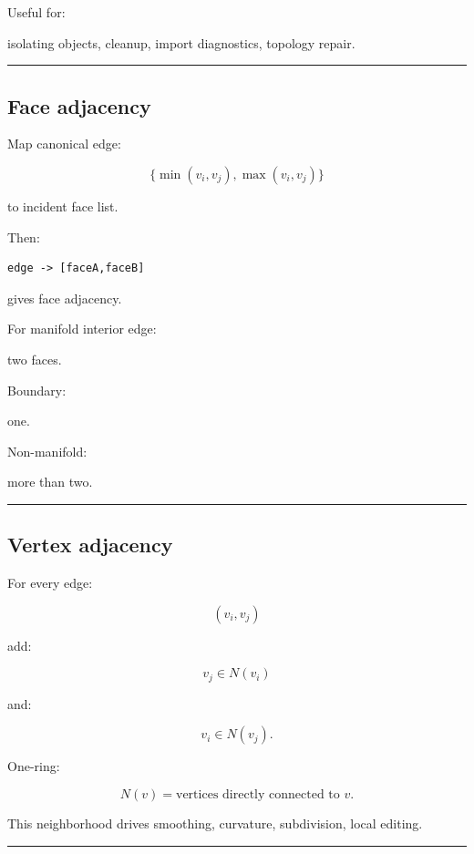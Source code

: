 Useful for:

isolating objects, cleanup, import diagnostics, topology repair.

\begin{center}\rule{0.5\linewidth}{0.5pt}\end{center}

\subsection{Face adjacency}\label{04-visual-computing-ii-ch041-face-adjacency}

Map canonical edge:

\[
\{\min(v_i,v_j),\max(v_i,v_j)\}
\]

to incident face list.

Then:

\begin{verbatim}
edge -> [faceA,faceB]
\end{verbatim}

gives face adjacency.

For manifold interior edge:

two faces.

Boundary:

one.

Non-manifold:

more than two.

\begin{center}\rule{0.5\linewidth}{0.5pt}\end{center}

\subsection{Vertex adjacency}\label{04-visual-computing-ii-ch041-vertex-adjacency}

For every edge:

\[
(v_i,v_j)
\]

add:

\[
v_j\in N(v_i)
\]

and:

\[
v_i\in N(v_j).
\]

One-ring:

\[
\boxed{
N(v)
=
\text{vertices directly connected to }v.
}
\]

This neighborhood drives smoothing, curvature, subdivision, local editing.

\begin{center}\rule{0.5\linewidth}{0.5pt}\end{center}

